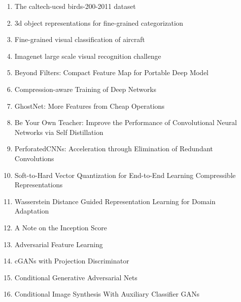 \documentclass[acmlarge]{acmart}
\begin{document}
\begin{enumerate}
	\item The caltech-ucsd birds-200-2011 dataset \cite{wah2011caltech} 

	\item 3d object representations for fine-grained categorization \cite{krause20133d} 

	\item Fine-grained visual classification of aircraft \cite{maji2013fine} 

	\item Imagenet large scale visual recognition challenge \cite{russakovsky2015imagenet} 

	\item Beyond Filters: Compact Feature Map for Portable Deep Model \cite{pmlr-v70-wang17m} 

	\item Compression-aware Training of Deep Networks \cite{alvarez2017compressionaware} 

	\item GhostNet: More Features from Cheap Operations \cite{han2019ghostnet} 

	\item Be Your Own Teacher: Improve the Performance of Convolutional Neural Networks via Self Distillation \cite{zhang2019teacher} 

	\item PerforatedCNNs: Acceleration through Elimination of Redundant Convolutions \cite{figurnov2015perforatedcnns} 

	\item Soft-to-Hard Vector Quantization for End-to-End Learning Compressible Representations \cite{agustsson2017softtohard} 

	\item Wasserstein Distance Guided Representation Learning for Domain Adaptation \cite{shen2017wasserstein} 

	\item A Note on the Inception Score \cite{barratt2018note} 

	\item Adversarial Feature Learning \cite{donahue2016adversarial} 

	\item cGANs with Projection Discriminator \cite{miyato2018cgans} 

	\item Conditional Generative Adversarial Nets \cite{mirza2014conditional} 

	\item Conditional Image Synthesis With Auxiliary Classifier GANs \cite{odena2016conditional} 


\end{enumerate}
\end{document}
